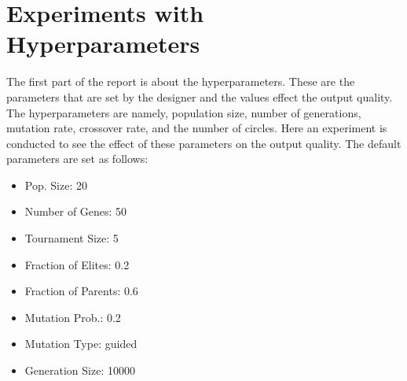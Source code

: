 \documentclass[3p,times,procedia]{elsarticle}
\begin{document}



\enlargethispage{10mm}
\section{\textbf{Experiments with Hyperparameters}}
\label{main}

The first part of the report is about the hyperparameters. These are the parameters that are set by the designer and the values effect the output quality.
The hyperparameters are namely, population size, number of generations, mutation rate, crossover rate, and the number of circles.
Here an experiment is conducted to see the effect of these parameters on the output quality.
The default parameters are set as follows:
\begin{multicols}{3}
    \begin{itemize}
    \item Pop. Size: 20 
    \item Number of Genes: 50  
    \item Tournament Size: 5   
    \item Fraction of Elites: 0.2  
    \item Fraction of Parents: 0.6
    \item Mutation Prob.: 0.2
    \item Mutation Type: guided
    \item Generation Size: 10000 
    \end{itemize}
\end{multicols}
\end{document}
